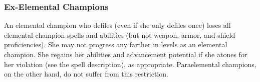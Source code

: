 {\subsubsection{Ex-Elemental Champions}
An elemental champion who defiles (even if she only defiles once) loses all elemental champion spells and abilities (but not weapon, armor, and shield proficiencies). She may not progress any farther in levels as an elemental champion. She regains her abilities and advancement potential if she atones for her violation (see the  spell description), as appropriate. Paraelemental champions, on the other hand, do not suffer from this restriction.
}